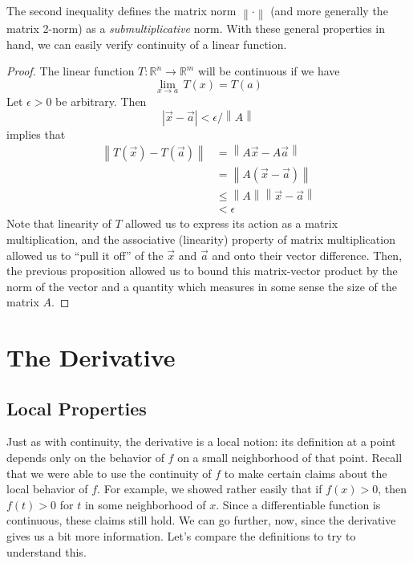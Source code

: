 The second inequality defines the matrix norm $\left\lVert \cdot \right\rVert$ (and more generally the matrix 2-norm) as a \textit{submultiplicative} norm. With these general properties in hand, we can easily verify continuity of a linear function.

\begin{proof}
The linear function $T:\mathbb{R}^n \rightarrow \mathbb{R}^m$ will be continuous if we have \[ \lim_{x\rightarrow a}\, T\left(x\right) = T\left(a\right) \] Let $\epsilon >0 $ be arbitrary. Then \[ \left\lvert \vec{x} - \vec{a} \right\rvert < \epsilon / \left\lVert A \right\rVert  \] implies that
\begin{align*}
\left\lVert T\left(\vec{x}\right) - T\left(\vec{a}\right) \right\rVert & = \left\lVert A\vec{x} - A\vec{a} \right\rVert \\ 
& = \left\lVert A\left(\vec{x} - \vec{a}\right) \right\rVert \\ 
& \leq \left\lVert A \right\rVert \left\lVert \vec{x} - \vec{a} \right\rVert \\
& < \epsilon
\end{align*}
Note that linearity of $T$ allowed us to express its action as a matrix multiplication, and the associative (linearity) property of matrix multiplication allowed us to ``pull it off'' of the $\vec{x}$ and $\vec{a}$ and onto their vector difference. Then, the previous proposition allowed us to bound this matrix-vector product by the norm of the vector and a quantity which measures in some sense the size of the matrix $A$.
\end{proof}




















\chapter{The Derivative}






\section{Local Properties}

Just as with continuity, the derivative is a local notion: its definition at a point depends only on the behavior of $f$ on a small neighborhood of that point. Recall that we were able to use the continuity of $f$ to make certain claims about the local behavior of $f$. For example, we showed rather easily that if $f\left(x\right)>0$, then $f\left(t\right)>0$ for $t$ in some neighborhood of $x$. Since a differentiable function is continuous, these claims still hold. We can go further, now, since the derivative gives us a bit more information. Let's compare the definitions to try to understand this.

